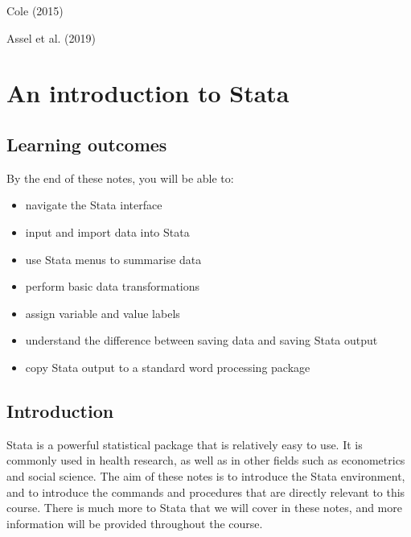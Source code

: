 \documentclass[
  a4paper,
]{memoir}
\providecommand{\tightlist}{%
  \setlength{\itemsep}{0pt}\setlength{\parskip}{0pt}}\usepackage{longtable,booktabs,array}
\begin{document}
Cole (2015)

Assel et al. (2019)

\newpage{}


\hypertarget{an-introduction-to-stata}{%
\chapter*{An introduction to Stata}\label{an-introduction-to-stata}}


\hypertarget{learning-outcomes-1}{%
\section*{Learning outcomes}\label{learning-outcomes-1}}


By the end of these notes, you will be able to:

\begin{itemize}
\tightlist
\item
  navigate the Stata interface
\item
  input and import data into Stata
\item
  use Stata menus to summarise data
\item
  perform basic data transformations
\item
  assign variable and value labels
\item
  understand the difference between saving data and saving Stata output
\item
  copy Stata output to a standard word processing package
\end{itemize}

\hypertarget{introduction}{%
\section{Introduction}\label{introduction}}

Stata is a powerful statistical package that is relatively easy to use.
It is commonly used in health research, as well as in other fields such
as econometrics and social science. The aim of these notes is to
introduce the Stata environment, and to introduce the commands and
procedures that are directly relevant to this course. There is much more
to Stata that we will cover in these notes, and more information will be
provided throughout the course.
\end{document}
